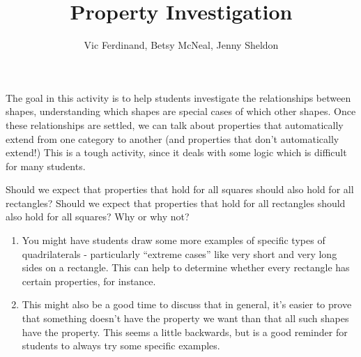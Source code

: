 \documentclass[handout]{ximera}
\title{Property Investigation}
\author{Vic Ferdinand, Betsy McNeal, Jenny Sheldon}
\begin{document}
\begin{abstract}\end{abstract}
\maketitle

\begin{instructorIntro}
The goal in this activity is to help students investigate the relationships between shapes, understanding which shapes are special cases of which other shapes.  Once these relationships are settled, we can talk about properties that automatically extend from one category to another (and properties that don't automatically extend!)  This is a tough activity, since it deals with some logic which is difficult for many students.
\end{instructorIntro}

\begin{problem} Should we expect that properties that hold for all squares should also hold for all rectangles?  Should we expect that properties that hold for all rectangles should also hold for all squares?  Why or why not? 


\begin{instructorNotes}
\begin{enumerate}
\item You might have students draw some more examples of specific types of quadrilaterals - particularly ``extreme cases'' like very short and very long sides on a rectangle.  This can help to determine whether every rectangle has certain properties, for instance.
\item This might also be a good time to discuss that in general, it's easier to prove that something doesn't have the property we want than that all such shapes have the property.  This seems a little backwards, but is a good reminder for students to always try some specific examples.
\end{enumerate}
\end{instructorNotes}
\end{problem}
\end{document}
